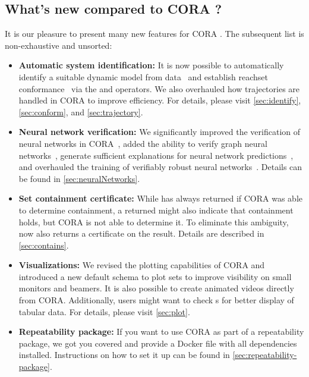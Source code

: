 \subsection{What's new compared to CORA \lastCORAVERSION?}

It is our pleasure to present many new features for CORA \CORAVERSION.
The subsequent list is non-exhaustive and unsorted:

\begin{itemize}

	\item \textbf{Automatic system identification:}
		It is now possible to automatically identify a suitable dynamic model from data~\cite{Kochdumper2025}
		and establish reachset conformance~\cite{Luetzow2024b, Luetzow2025a}
		via the  and  operators.
		We also overhauled how trajectories are handled in CORA to improve efficiency.
		For details, please visit \cref{sec:identify}, \cref{sec:conform}, and \cref{sec:trajectory}.

	\item \textbf{Neural network verification:}
		We significantly improved the verification of neural networks in CORA~\cite{koller2025a},
		added the ability to verify graph neural networks~\cite{ladner2025gnn},
		generate sufficient explanations for neural network predictions~\cite{ladner2025xai},
		and overhauled the training of verifiably robust neural networks~\cite{koller2024a}.
		Details can be found in \cref{sec:neuralNetworks}.

	\item \textbf{Set containment certificate:}
		While  has always returned  if CORA was able to determine containment,
		a returned  might also indicate that containment holds, but CORA is not able to determine it.
		To eliminate this ambiguity,  now also returns a certificate on the result.
		Details are described in \cref{sec:contains}.

	\item \textbf{Visualizations:}
		We revised the plotting capabilities of CORA
		and introduced a new default schema to plot sets to improve visibility on small monitors and beamers.
		It is also possible to create animated videos directly from CORA.
		Additionally, users might want to check s for better display of tabular data.
		For details, please visit \cref{sec:plot}.

	\item \textbf{Repeatability package:}
		If you want to use CORA as part of a repeatability package,
		we got you covered and provide a Docker file with all dependencies installed.
		Instructions on how to set it up can be found in \cref{sec:repeatability-package}.


\end{itemize}
